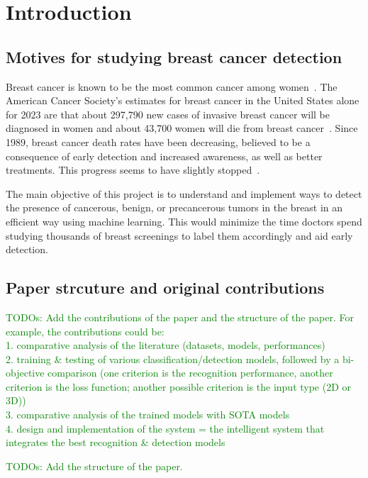 \chapter{Introduction}
\label{intro}

\section{Motives for studying breast cancer detection}


Breast cancer is known to be the most common cancer among women~\cite{link1}. The American Cancer Society’s estimates for breast cancer in the United States alone for 2023 are that about 297,790 new cases of invasive breast cancer will be diagnosed in women and about 43,700 women will die from breast cancer~\cite{link2}. Since 1989, breast cancer death rates have been decreasing, believed to be a consequence of early detection and increased awareness, as well as better treatments. This progress seems to have slightly stopped~\cite{link2}.

The main objective of this project is to understand and implement ways to detect the presence of cancerous, benign, or precancerous tumors in the breast in an efficient way using machine learning. This would minimize the time doctors spend studying thousands of breast screenings to label them accordingly and aid early detection.

\section{Paper strcuture and original contributions}

\textcolor{green}{TODOs: Add the contributions of the paper and the structure of the paper. For example, the contributions could be:\\
1. comparative analysis of the literature (datasets, models, performances)\\
2. training \& testing of various classification/detection models, followed by a bi-objective comparison (one criterion is the recognition performance, another criterion is the loss function; another possible criterion is the input type (2D or 3D))\\
3. comparative analysis of the trained models with SOTA models\\
4. design and implementation of the system = the intelligent system that integrates the best recognition \& detection models\\
}

\textcolor{green}{TODOs: Add the structure of the paper.}